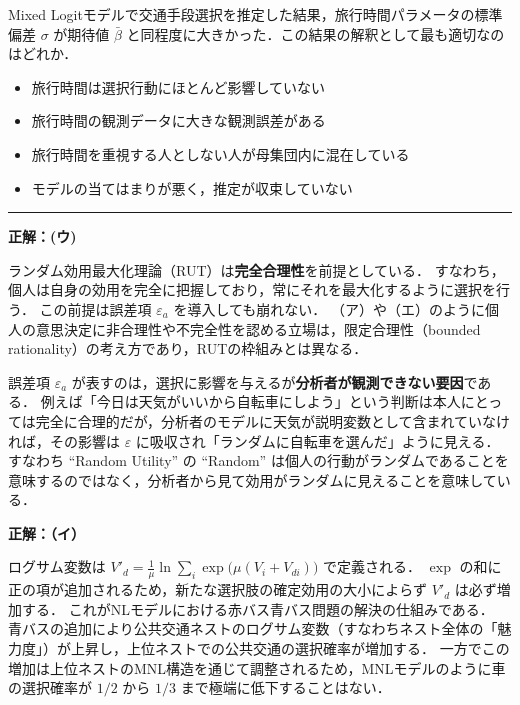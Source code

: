 \begin{example}[title={クイズ 3：Mixed Logitの推定結果の解釈}]
Mixed Logitモデルで交通手段選択を推定した結果，旅行時間パラメータの標準偏差 $\sigma$ が期待値 $\bar{\beta}$ と同程度に大きかった．この結果の解釈として最も適切なのはどれか．
\begin{itemize}
  \item[(ア)] 旅行時間は選択行動にほとんど影響していない
  \item[(イ)] 旅行時間の観測データに大きな観測誤差がある
  \item[(ウ)] 旅行時間を重視する人としない人が母集団内に混在している
  \item[(エ)] モデルの当てはまりが悪く，推定が収束していない
\end{itemize}
\end{example}

\vspace{1em}
\hrule
\vspace{1em}


\begin{example}[title={クイズ 1 正解・解説}]
\label{ans:q1}
\textbf{正解：(ウ)}

ランダム効用最大化理論（RUT）は\textbf{完全合理性}を前提としている．
すなわち，個人は自身の効用を完全に把握しており，常にそれを最大化するように選択を行う．
この前提は誤差項 $\varepsilon_a$ を導入しても崩れない．
（ア）や（エ）のように個人の意思決定に非合理性や不完全性を認める立場は，限定合理性（bounded rationality）の考え方であり，RUTの枠組みとは異なる．

誤差項 $\varepsilon_a$ が表すのは，選択に影響を与えるが\textbf{分析者が観測できない要因}である．
例えば「今日は天気がいいから自転車にしよう」という判断は本人にとっては完全に合理的だが，分析者のモデルに天気が説明変数として含まれていなければ，その影響は $\varepsilon$ に吸収され「ランダムに自転車を選んだ」ように見える．
すなわち ``Random Utility'' の ``Random'' は個人の行動がランダムであることを意味するのではなく，分析者から見て効用がランダムに見えることを意味している．
\end{example}



\begin{example}[title={クイズ 2 正解・解説}]
\label{ans:ch2-q2}
\textbf{正解：（イ）}

ログサム変数は $V'_d = \frac{1}{\mu}\ln\sum_i \exp\bigl(\mu (V_i + V_{di})\bigr)$ で定義される．
$\exp$ の和に正の項が追加されるため，新たな選択肢の確定効用の大小によらず $V'_d$ は必ず増加する．
これがNLモデルにおける赤バス青バス問題の解決の仕組みである．
青バスの追加により公共交通ネストのログサム変数（すなわちネスト全体の「魅力度」）が上昇し，上位ネストでの公共交通の選択確率が増加する．
一方でこの増加は上位ネストのMNL構造を通じて調整されるため，MNLモデルのように車の選択確率が $1/2$ から $1/3$ まで極端に低下することはない．
\end{example}

